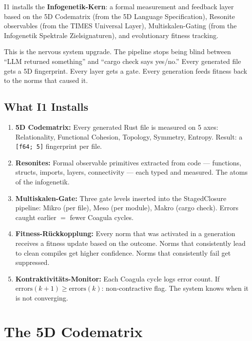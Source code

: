 \documentclass[11pt,a4paper]{article}
\begin{document}
I1 installs the \textbf{Infogenetik-Kern}: a formal measurement 
and feedback layer based on the 5D Codematrix (from the 5D 
Language Specification), Resonite observables (from the TIMES 
Universal Layer), Multiskalen-Gating (from the Infogenetik 
Spektrale Zielsignaturen), and evolutionary fitness tracking.

This is the nervous system upgrade. The pipeline stops being 
blind between ``LLM returned something'' and ``cargo check 
says yes/no.'' Every generated file gets a 5D fingerprint. 
Every layer gets a gate. Every generation feeds fitness back 
to the norms that caused it.

\subsection{What I1 Installs}

\begin{enumerate}[nosep]
\item \textbf{5D Codematrix:} Every generated Rust file is 
      measured on 5 axes: Relationality, Functional Cohesion, 
      Topology, Symmetry, Entropy. Result: a \texttt{[f64; 5]} 
      fingerprint per file.
\item \textbf{Resonites:} Formal observable primitives extracted 
      from code --- functions, structs, imports, layers, 
      connectivity --- each typed and measured. The atoms of 
      the infogenetik.
\item \textbf{Multiskalen-Gate:} Three gate levels inserted 
      into the StagedClosure pipeline: Mikro (per file), 
      Meso (per module), Makro (cargo check). Errors caught 
      earlier $=$ fewer Coagula cycles.
\item \textbf{Fitness-R\"uckkopplung:} Every norm that was 
      activated in a generation receives a fitness update 
      based on the outcome. Norms that consistently lead to 
      clean compiles get higher confidence. Norms that 
      consistently fail get suppressed.
\item \textbf{Kontraktivit\"ats-Monitor:} Each Coagula cycle 
      logs error count. If $\text{errors}(k+1) \geq 
      \text{errors}(k)$: non-contractive flag. The system 
      knows when it is not converging.
\end{enumerate}


\section{The 5D Codematrix}
\label{sec:codematrix}
\end{document}
